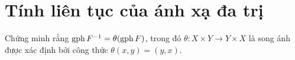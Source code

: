 \chapter{Tính liên tục của ánh xạ đa trị}

\begin{ex}
    Chứng minh rằng $\operatorname{gph} F^{-1} = \theta(\operatorname{gph} F)$, trong đó $\theta: X \times Y \rightarrow Y \times X$ là song ánh được xác định bởi công thức $\theta(x, y) = (y, x)$. 
\end{ex}